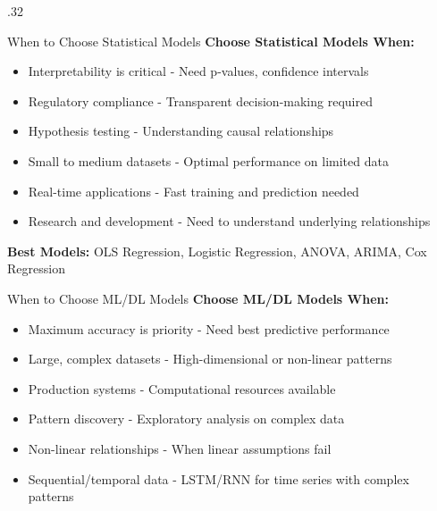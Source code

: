 \documentclass[final]{beamer}
\begin{document}
\begin{frame}[t]
\begin{columns}[t]
\begin{column}{.32\linewidth}
\begin{block}{When to Choose Statistical Models}
\textcolor{statcolor}{\textbf{Choose Statistical Models When:}}
\begin{itemize}
    \item \textcolor{statcolor}{} Interpretability is critical - Need p-values, confidence intervals
    \item \textcolor{statcolor}{} Regulatory compliance - Transparent decision-making required
    \item \textcolor{statcolor}{} Hypothesis testing - Understanding causal relationships
    \item \textcolor{statcolor}{} Small to medium datasets - Optimal performance on limited data
    \item \textcolor{statcolor}{} Real-time applications - Fast training and prediction needed
    \item \textcolor{statcolor}{} Research and development - Need to understand underlying relationships
\end{itemize}

\vspace{0.3cm}
\textbf{Best Models:} OLS Regression, Logistic Regression, ANOVA, ARIMA, Cox Regression
\end{block}

\begin{block}{When to Choose ML/DL Models}
\textcolor{mlcolor}{\textbf{Choose ML/DL Models When:}}
\begin{itemize}
    \item \textcolor{mlcolor}{} Maximum accuracy is priority - Need best predictive performance
    \item \textcolor{mlcolor}{} Large, complex datasets - High-dimensional or non-linear patterns
    \item \textcolor{mlcolor}{} Production systems - Computational resources available
    \item \textcolor{mlcolor}{} Pattern discovery - Exploratory analysis on complex data
    \item \textcolor{mlcolor}{} Non-linear relationships - When linear assumptions fail
    \item \textcolor{dlcolor}{} Sequential/temporal data - LSTM/RNN for time series with complex patterns
\end{itemize}


\end{block}
\end{column}
\end{columns}
\end{frame}
\end{document}
